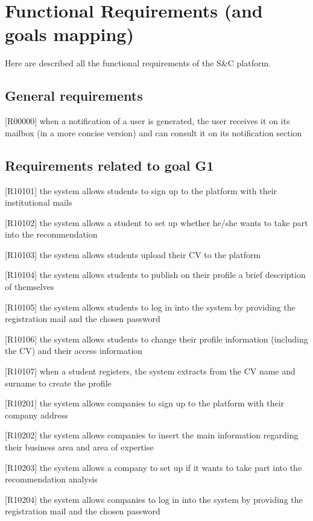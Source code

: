 	\section{Functional Requirements (and goals mapping)}
		Here are described all the functional requirements of the S\&C platform.
		
		\subsection{General requirements}
		
		[R00000] when a notification of a user is generated, the user receives it on its mailbox (in a more concise version) and can consult it on its notification section
		
		\subsection{Requirements related to goal G1}
		
		[R10101] the system allows students to sign up to the platform with their institutional mails
		
		[R10102] the system allows a student to set up whether he/she wants to take part into the recommendation
		
		[R10103] the system allows students upload their CV to the platform
		
		[R10104] the system allows students to publish on their profile a brief description of themselves
		
		[R10105] the system allows students to log in into the system by providing the registration mail and the chosen	password
		
		[R10106] the system allows students to change their profile information (including the CV) and their access information
		
		[R10107] when a student registers, the system extracts from the CV name and surname to create the profile
		
		[R10201] the system allows companies to sign up to the platform with their company address
		
		[R10202] the system allows companies to insert the main information regarding their business area and area of expertise
		
		[R10203] the system allows a company to set up if it wants to take part into the recommendation analysis
		
		[R10204] the system allows companies to log in into the system by providing the registration mail and the chosen password
		
